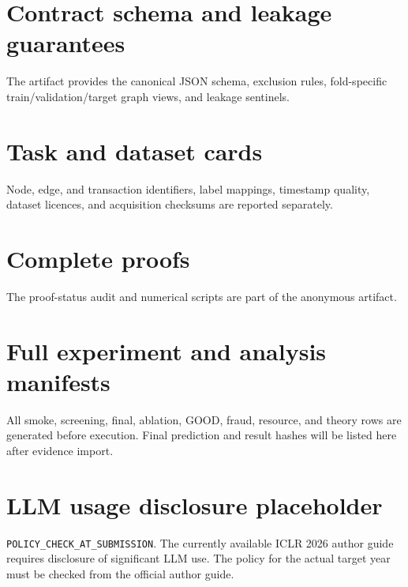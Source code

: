 \section{Contract schema and leakage guarantees}
The artifact provides the canonical JSON schema, exclusion rules, fold-specific
train/validation/target graph views, and leakage sentinels.

\section{Task and dataset cards}
Node, edge, and transaction identifiers, label mappings, timestamp quality,
dataset licences, and acquisition checksums are reported separately.

\section{Complete proofs}
The proof-status audit and numerical scripts are part of the anonymous artifact.

\section{Full experiment and analysis manifests}
All smoke, screening, final, ablation, GOOD, fraud, resource, and theory rows
are generated before execution. Final prediction and result hashes will be
listed here after evidence import.

\section{LLM usage disclosure placeholder}
\texttt{POLICY\_CHECK\_AT\_SUBMISSION}. The currently available ICLR 2026
author guide requires disclosure of significant LLM use. The policy for the
actual target year must be checked from the official author guide.
